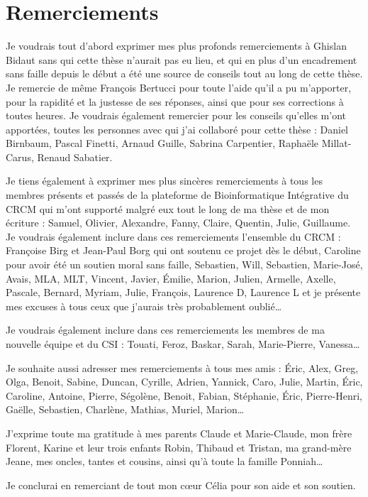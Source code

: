 \chapter*{Remerciements}

\noindent{}Je voudrais tout d'abord exprimer mes plus profonds remerciements à Ghislan Bidaut sans qui cette thèse n'aurait pas eu lieu, et qui en plus d'un encadrement sans faille depuis le début a été une source de conseils tout au long de cette thèse. Je remercie de même François Bertucci pour toute l'aide qu'il a pu m'apporter, pour la rapidité et la justesse de ses réponses, ainsi que pour ses corrections à toutes heures. Je voudrais également remercier pour les conseils qu'elles m'ont apportées, toutes les personnes avec qui j'ai collaboré pour cette thèse : Daniel Birnbaum, Pascal Finetti, Arnaud Guille, Sabrina Carpentier, Raphaële Millat-Carus, Renaud Sabatier.
\vspace{.5cm}

\noindent{}Je tiens également à exprimer mes plus sincères remerciements à tous les membres présents et passés de la plateforme de Bioinformatique Intégrative du CRCM qui m'ont supporté malgré eux tout le long de ma thèse et de mon écriture : Samuel, Olivier, Alexandre, Fanny, Claire, Quentin, Julie, Guillaume. Je voudrais également inclure dans ces remerciements l'ensemble du CRCM : Françoise Birg et Jean-Paul Borg qui ont soutenu ce projet dès le début, Caroline pour avoir été un soutien moral sans faille, Sebastien, Will, Sebastien, Marie-José, Avais, MLA, MLT, Vincent, Javier, Émilie, Marion, Julien, Armelle, Axelle, Pascale, Bernard, Myriam, Julie, François, Laurence D, Laurence L et je présente mes excuses à tous ceux que j'aurais très probablement oublié\dots
\vspace{.5cm}

\noindent{}Je voudrais également inclure dans ces remerciements les membres de ma nouvelle équipe et du \acs{CSI} : Touati, Feroz, Baskar, Sarah, Marie-Pierre, Vanessa\dots
\vspace{.5cm}

\noindent{}Je souhaite aussi adresser mes remerciements à tous mes amis : Éric, Alex, Greg, Olga, Benoit, Sabine, Duncan, Cyrille, Adrien, Yannick, Caro, Julie, Martin, Éric, Caroline, Antoine, Pierre, Ségolène, Benoit, Fabian, Stéphanie, Éric, Pierre-Henri, Gaëlle, Sebastien, Charlène, Mathias, Muriel, Marion\dots
\vspace{.5cm}

\noindent{}J'exprime toute ma gratitude à mes parents Claude et Marie-Claude, mon frère Florent, Karine et leur trois enfants Robin, Thibaud et Tristan, ma grand-mère Jeane, mes oncles, tantes et cousins, ainsi qu'à toute la famille Ponniah\dots
\vspace{.5cm}

\noindent{}Je conclurai en remerciant de tout mon c{\oe}ur Célia pour son aide et son soutien.